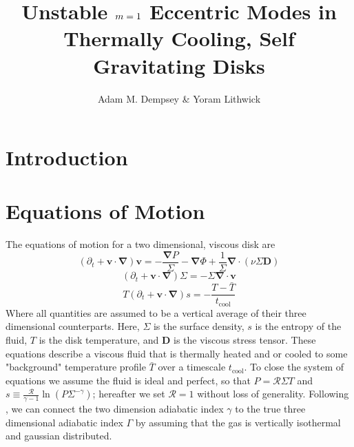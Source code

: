 \documentclass[apj]{emulateapj}
\begin{document}
\title{Unstable $\MakeLowercase{m} = 1$ Eccentric Modes in Thermally Cooling, Self Gravitating Disks}
\author{Adam M. Dempsey \& Yoram Lithwick}


\begin{abstract}


\end{abstract}


\section{Introduction}

\section{Equations of Motion}
The equations of motion for a two dimensional, viscous disk are
\begin{equation}
(\partial_t + \mathbf{v} \cdot \mathbf{\nabla}) \mathbf{v} = - \frac{ \mathbf{\nabla} P}{\Sigma} - \mathbf{\nabla}\Phi + \frac{1}{\Sigma} \mathbf{\nabla} \cdot ( \nu \Sigma \mathbf{D} )
\end{equation}
\begin{equation}
(\partial_t + \mathbf{v} \cdot \mathbf{\nabla}) \Sigma = - \Sigma \mathbf{\nabla} \cdot \mathbf{v}
\end{equation}
\begin{equation}
T (\partial_t + \mathbf{v} \cdot \mathbf{\nabla} ) s = - \frac{ T - \bar{T}}{t_\text{cool}}
\end{equation}
Where all quantities are assumed to be a vertical average of their three dimensional counterparts. Here, $\Sigma$ is the surface density, $s$ is the entropy of the fluid, $T$ is the disk temperature, and $\mathbf{D}$ is the viscous stress tensor. These equations describe a viscous fluid that is thermally heated and or cooled to some "background" temperature profile $\bar{T}$ over a timescale $t_\text{cool}$. To close the system of equations we assume the fluid is ideal and perfect, so that $P =  \mathcal{R} \Sigma T $ and $s \equiv \frac{\mathcal{R}}{\gamma -1} \ln \left( P \Sigma^{-\gamma} \right)$; hereafter we set $\mathcal{R} =1$ without loss of generality. Following \citet{osa92}, we can connect the two dimension adiabatic index $\gamma$ to the true three dimensional adiabatic index $\Gamma$ by assuming that the gas is vertically isothermal and gaussian distributed. 
\end{document}
